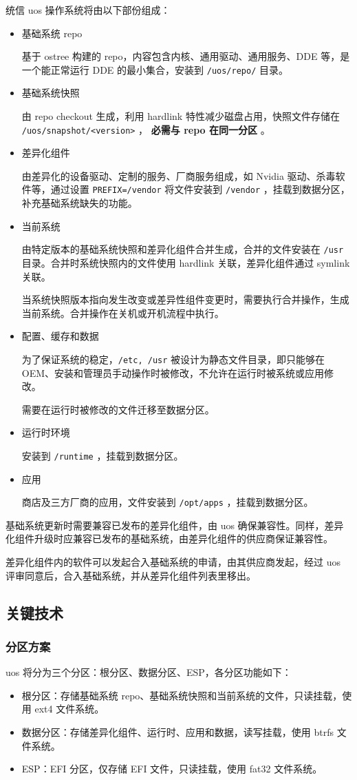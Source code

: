 \documentclass{utart}
\begin{document}
统信 uos 操作系统将由以下部份组成：
\begin{itemize}[leftmargin=4em]
\item 基础系统 repo

  基于 ostree 构建的 repo，内容包含内核、通用驱动、通用服务、DDE 等，是一个能正常运行 DDE 的最小集合，安装到 \texttt{/uos/repo/} 目录。
\item 基础系统快照

  由 repo checkout 生成，利用 hardlink 特性减少磁盘占用，快照文件存储在 \texttt{/uos/snapshot/<version>} ， \textbf{必需与 repo 在同一分区} 。
\item 差异化组件

  由差异化的设备驱动、定制的服务、厂商服务组成，如 Nvidia 驱动、杀毒软件等，通过设置 \texttt{PREFIX=/vendor} 将文件安装到 \texttt{/vendor} ，挂载到数据分区，补充基础系统缺失的功能。
\item 当前系统

  由特定版本的基础系统快照和差异化组件合并生成，合并的文件安装在 \texttt{/usr} 目录。合并时系统快照内的文件使用 hardlink 关联，差异化组件通过 symlink 关联。

  当系统快照版本指向发生改变或差异性组件变更时，需要执行合并操作，生成当前系统。合并操作在关机或开机流程中执行。
\item 配置、缓存和数据

  为了保证系统的稳定，\texttt{/etc, /usr} 被设计为静态文件目录，即只能够在 OEM、安装和管理员手动操作时被修改，不允许在运行时被系统或应用修改。

  需要在运行时被修改的文件迁移至数据分区。
\item 运行时环境

  安装到 \texttt{/runtime} ，挂载到数据分区。
\item 应用

  商店及三方厂商的应用，文件安装到 \texttt{/opt/apps} ，挂载到数据分区。
\end{itemize}

基础系统更新时需要兼容已发布的差异化组件，由 uos 确保兼容性。同样，差异化组件升级时应兼容已发布的基础系统，由差异化组件的供应商保证兼容性。

差异化组件内的软件可以发起合入基础系统的申请，由其供应商发起，经过 uos 评审同意后，合入基础系统，并从差异化组件列表里移出。

\subsection{关键技术}
\subsubsection{分区方案}
uos 将分为三个分区：根分区、数据分区、ESP，各分区功能如下：
\begin{itemize}[leftmargin=4em]
\item 根分区：存储基础系统 repo、基础系统快照和当前系统的文件，只读挂载，使用 ext4 文件系统。
\item 数据分区：存储差异化组件、运行时、应用和数据，读写挂载，使用 btrfs 文件系统。
\item ESP：EFI 分区，仅存储 EFI 文件，只读挂载，使用 fat32 文件系统。
\end{itemize}
\end{document}
